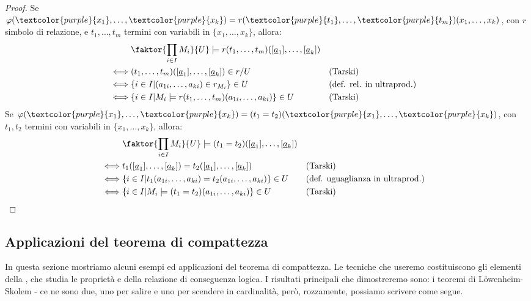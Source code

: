 \begin{proof}
        Se $\varphi(\textcolor{purple}{x_1},\ldots,\textcolor{purple}{x_k}) = r(\textcolor{purple}{t_1},\ldots,\textcolor{purple}{t_m})(x_1,\ldots,x_k)$, con $r$ simbolo di relazione, e $t_1,\ldots,t_m$ termini con variabili in $\{x_1,\ldots,x_k\}$, allora:
        \begin{align*}
            &\faktor{\prod_{i \in I} M_i}{U} \models r(t_1,\ldots,t_m)([\underline a_1],\ldots,[\underline a_k]) \\
            \iff& (t_1,\ldots,t_m)([\underline a_1],\ldots,[\underline a_k]) \in r/U && \text{(Tarski)}\\
            \iff& \{i \in I | (a_{1i},\ldots,a_{ki}) \in r_{M_i}\} \in U && \text{(def. rel. in ultraprod.)}\\
            \iff& \{i \in I | M_i \models r(t_1,\ldots,t_m)(a_{1i},\ldots,a_{ki})\} \in U && \text{(Tarski)}
        \end{align*}
        Se $\varphi(\textcolor{purple}{x_1},\ldots,\textcolor{purple}{x_k}) = (t_1 = t_2)(\textcolor{purple}{x_1},\ldots,\textcolor{purple}{x_k})$, con $t_1,t_2$ termini con variabili in $\{x_1,\ldots,x_k\}$, allora:
        \begin{align*}
            &\faktor{\prod_{i \in I} M_i}{U} \models (t_1 = t_2)([\underline a_1],\ldots,[\underline a_k]) \\
            \iff& t_1([\underline a_1],\ldots,[\underline a_k]) = t_2([\underline a_1],\ldots,[\underline a_k]) && \text{(Tarski)}\\
            \iff& \{i \in I | t_1(a_{1i},\ldots,a_{ki}) = t_2(a_{1i},\ldots,a_{ki})\} \in U && \text{(def. uguaglianza in ultraprod.)}\\
            \iff& \{i \in I | M_i \models (t_1 = t_2)(a_{1i},\ldots,a_{ki})\} \in U && \text{(Tarski)}
        \end{align*}
\end{proof}

\subsection{Applicazioni del teorema di compattezza}
In questa sezione mostriamo alcuni esempi ed applicazioni del teorema di compattezza. Le tecniche che useremo costituiscono gli elementi della , che
studia le proprietà e della relazione di conseguenza logica. I risultati principali che dimostreremo sono: i teoremi di Löwenheim-Skolem - ce ne sono due, uno per salire e uno per scendere in cardinalità,
però, rozzamente, possiamo scrivere come segue.

